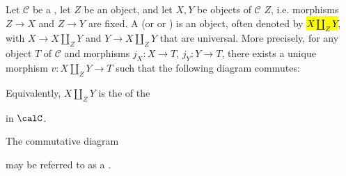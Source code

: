 \begin{definition} \label{definition:cocartesian_sum_of_two_objects_in_a_category_under_an_object}
    Let $\mathcal{C}$ be a , let $Z$ be an object, and let $X, Y$ be objects of $\mathcal{C}$  $Z$, i.e. morphisms $Z \to X$ and $Z \to Y$ are fixed. A  (or  or ) is an object, often denoted by \hl{$X \amalg_Z Y$}, with  $X \to X \amalg_Z Y$ and $Y \to X \amalg_Z Y$ that are universal. 
    More precisely, for any object $T$ of $\mathcal{C}$ and morphisms $j_X : X \to T$, $j_Y : Y \to T$, there exists a unique morphism $v : X \amalg_Z Y \to T$ such that the following diagram commutes:
    \begin{center}
    \end{center}

        Equivalently, $X \amalg_Z Y$ is the  of the 
        \begin{center}
        \end{center}
        in $\calC$. 

        The commutative diagram 
        \begin{center}
        \end{center}
        may be referred to as a .

\end{definition}